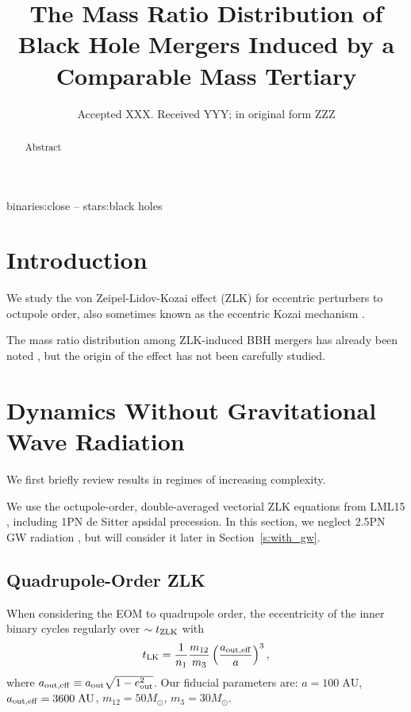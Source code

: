 \documentclass[
        fleqn,
        usenatbib,
    ]{mnras}
\title[Mass Ratio Distribution]{The Mass Ratio Distribution of
Black Hole Mergers Induced by a Comparable Mass Tertiary}
\date{Accepted XXX\@. Received YYY\@; in original form ZZZ}
\newcommand*{\p}[1]{\left(#1\right)}
\begin{document}
\label{firstpage}
\pagerange{\pageref{firstpage}--\pageref{lastpage}}
\maketitle

\begin{abstract}
    Abstract
\end{abstract}

\begin{keywords}
binaries:close -- stars:black holes %
\end{keywords}


\section{Introduction}\label{s:intro}

We study the von Zeipel-Lidov-Kozai effect (ZLK) for eccentric perturbers to
octupole order, also sometimes known as the eccentric Kozai mechanism
\citep[e.g.][]{lithwick2011eccentric}.

The mass ratio distribution among ZLK-induced BBH mergers has already been noted
\citep[see Fig.~10 of][]{silsbee2017lidov}, but the origin of the effect has not
been carefully studied.

\section{Dynamics Without Gravitational Wave Radiation}\label{s:background}

We first briefly review results in regimes of increasing complexity.

We use the octupole-order, double-averaged vectorial ZLK equations from LML15
\citep{LML15}, including 1PN de Sitter apsidal precession. In this section, we
neglect 2.5PN GW radiation \citep{peters1964}, but will consider it later in
Section~\ref{s:with_gw}.

\subsection{Quadrupole-Order ZLK}

When considering the EOM to quadrupole order, the eccentricity of the inner
binary cycles regularly over $\sim t_{\rm ZLK}$ with
\begin{equation}
    t_{\rm LK} = \frac{1}{n_1}\frac{m_{12}}{m_3}
            \p{\frac{a_{\rm out, eff}}{a}}^3,
\end{equation}
where $a_{\rm out, eff} \equiv a_{\rm out}\sqrt{1 - e_{\rm out}^2}$. Our
fiducial parameters are: $a = 100\;\mathrm{AU}$, $a_{\rm out, eff} =
3600\;\mathrm{AU}$, $m_{12} = 50M_{\odot}$, $m_3 = 30M_{\odot}$.
\end{document}
